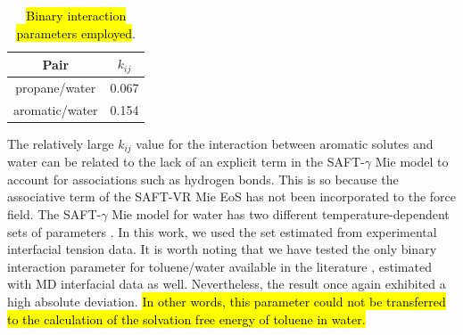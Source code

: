 \documentclass[final,12p,times,twocolumn]{elsarticle}
\begin{document}
	\begin{table}
		\centering
		\caption{\hl{Binary interaction parameters employed}.}
		\label{tbl:kij}
		\begin{tabular}{cc}
			\hline\hline
			Pair              & $k_{ij}$ \\ \hline
			propane/water  & 0.067    \\
			aromatic/water & 0.154    \\ \hline\hline
		\end{tabular}
	\end{table}
	
	The relatively large $k_{ij}$ value for the interaction between aromatic solutes and water can be related to the lack of an explicit term in the SAFT-$\gamma$ Mie model to account for associations such as hydrogen bonds. This is so because the associative term of the SAFT-VR Mie EoS \cite{lafitte2013} has not been incorporated to the force field. The SAFT-$\gamma$ Mie model for water has two different temperature-dependent sets of parameters \cite{lobanova2016}. In this work, we used the set estimated from experimental interfacial tension data. It is worth noting that we have tested the only binary interaction parameter for toluene/water available in the literature \cite{herdes2017}, estimated with MD interfacial data as well. Nevertheless, the result once again exhibited a high absolute deviation. \hl{In other words, this parameter could not be transferred to the calculation of the solvation free energy of toluene in water.} 
	
\end{document}
